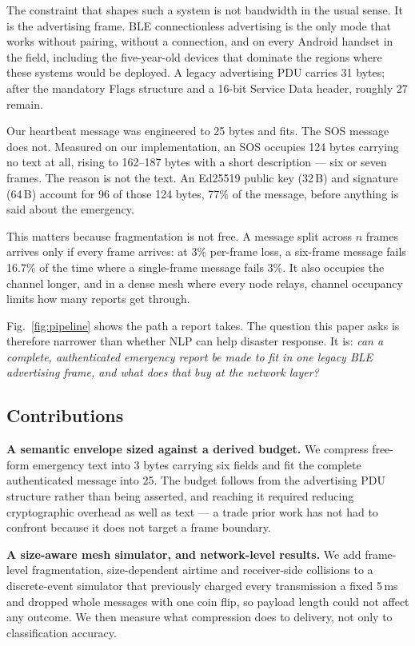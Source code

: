 \documentclass[conference]{IEEEtran}
\begin{document}
The constraint that shapes such a system is not bandwidth in the usual sense.
It is the advertising frame. BLE connectionless advertising is the only mode
that works without pairing, without a connection, and on every Android handset
in the field, including the five-year-old devices that dominate the regions
where these systems would be deployed. A legacy advertising PDU carries 31
bytes; after the mandatory Flags structure and a 16-bit Service Data header,
roughly 27 remain.

Our heartbeat message was engineered to 25 bytes and fits. The SOS message does
not. Measured on our implementation, an SOS occupies 124 bytes carrying no text
at all, rising to 162--187 bytes with a short description --- six or seven
frames. The reason is not the text. An Ed25519 public key (32\,B) and signature
(64\,B) account for 96 of those 124 bytes, 77\% of the message, before anything
is said about the emergency.

This matters because fragmentation is not free. A message split across $n$
frames arrives only if every frame arrives: at 3\% per-frame loss, a six-frame
message fails 16.7\% of the time where a single-frame message fails 3\%. It
also occupies the channel longer, and in a dense mesh where every node relays,
channel occupancy limits how many reports get through.

Fig.~\ref{fig:pipeline} shows the path a report takes. The question this paper asks is therefore narrower than whether NLP can help
disaster response. It is: \emph{can a complete, authenticated emergency report
be made to fit in one legacy BLE advertising frame, and what does that buy at
the network layer?}

\subsection{Contributions}

\textbf{A semantic envelope sized against a derived budget.} We compress
free-form emergency text into 3 bytes carrying six fields and fit the complete
authenticated message into 25. The budget follows from the advertising PDU
structure rather than being asserted, and reaching it required reducing
cryptographic overhead as well as text --- a trade prior work has not had to
confront because it does not target a frame boundary.

\textbf{A size-aware mesh simulator, and network-level results.} We add
frame-level fragmentation, size-dependent airtime and receiver-side collisions
to a discrete-event simulator that previously charged every transmission a
fixed 5\,ms and dropped whole messages with one coin flip, so payload length
could not affect any outcome. We then measure what compression does to
delivery, not only to classification accuracy.
\end{document}
